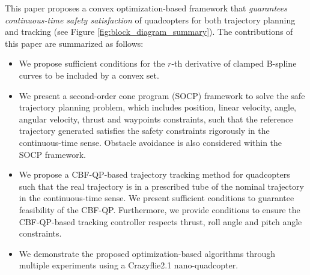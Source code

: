 \documentclass[journal,10pt]{IEEEtran}
\newif\ifdraft
\newcommand{\XX}[1]{\ifdraft{\color{red}[{\bf XX}: #1]}\fi}
\begin{document}
This paper proposes a convex optimization-based framework that \emph{guarantees continuous-time safety satisfaction} of quadcopters for both trajectory planning and tracking (see Figure \ref{fig:block_diagram_summary}). The contributions of this paper are summarized as follows:
\begin{itemize}
    \item We propose sufficient conditions for the $r$-th derivative of clamped B-spline curves to be included by a convex set. 
    \item We present a second-order cone program (SOCP) framework to solve the safe trajectory planning problem, which includes position, linear velocity, angle, angular velocity, thrust and waypoints constraints, such that the reference trajectory generated satisfies the safety constraints rigorously in the continuous-time sense. 
    Obstacle avoidance is also considered within the SOCP framework.
    \item We propose a CBF-QP-based trajectory tracking method for quadcopters such that the real trajectory is in a prescribed tube of the nominal trajectory in the continuous-time sense. We present sufficient conditions to guarantee feasibility of the CBF-QP. Furthermore, we provide conditions to ensure the CBF-QP-based tracking controller respects thrust, roll angle and pitch angle constraints.
    \item We demonstrate the proposed optimization-based algorithms through multiple experiments using a Crazyflie2.1 nano-quadcopter.
\end{itemize}
\end{document}
